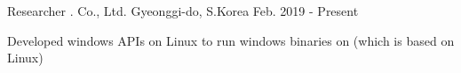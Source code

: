 

\begin{cvskills}


  \cventry
    {Researcher} %
    {\mycompany{}. Co., Ltd.} %
    {Gyeonggi-do, S.Korea} %
    {Feb. 2019 - Present} %
    {
      \begin{cvitems} %
        \item {Developed windows APIs on Linux to run windows binaries on \mycompany{} (which is based on Linux)}
      \end{cvitems}
    }




\end{cvskills}
